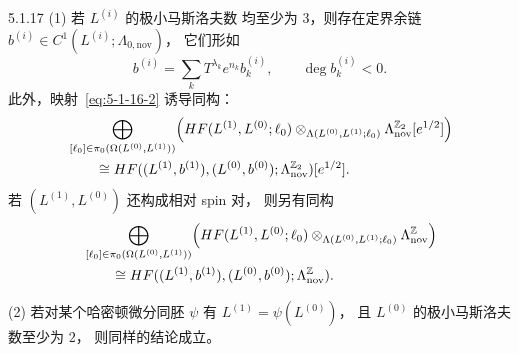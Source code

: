 \begin{proposition}{5.1.17}\label{prop:5-1-17}
\textup{(1)} 若 $L^{(i)}$ 的极小马斯洛夫数
均至少为 $3$，则存在定界余链
$b^{(i)}\in C^1(L^{(i)};\Lambda_{0,\mathrm{nov}})$，
它们形如
\[
b^{(i)}=\sum_k T^{\lambda_k}e^{n_k}b_k^{(i)},
\qquad \deg b_k^{(i)}<0.
\]
此外，映射~\eqref{eq:5-1-16-2}
诱导同构：
\[
\begin{aligned}
&\bigoplus_{[\ell_0]\in
 \pi_0(\Omega(L^{(0)},L^{(1)}))}
\Bigl(
HF(L^{(1)},L^{(0)};\ell_0)
\otimes_{\Lambda(L^{(0)},L^{(1)};\ell_0)}
\Lambda_{\mathrm{nov}}^{\mathbb Z_2}[e^{1/2}]
\Bigr)\\
&\hspace{2em}\cong
HF((L^{(1)},b^{(1)}),(L^{(0)},b^{(0)});
\Lambda_{\mathrm{nov}}^{\mathbb Z_2})[e^{1/2}].
\end{aligned}
\]
若 $(L^{(1)},L^{(0)})$ 还构成相对 spin 对，
则另有同构
\[
\begin{aligned}
&\bigoplus_{[\ell_0]\in
 \pi_0(\Omega(L^{(0)},L^{(1)}))}
\Bigl(
HF(L^{(1)},L^{(0)};\ell_0)
\otimes_{\Lambda(L^{(0)},L^{(1)};\ell_0)}
\Lambda_{\mathrm{nov}}^{\mathbb Z}
\Bigr)\\
&\hspace{2em}\cong
HF((L^{(1)},b^{(1)}),(L^{(0)},b^{(0)});
\Lambda_{\mathrm{nov}}^{\mathbb Z}).
\end{aligned}
\]

\textup{(2)} 若对某个哈密顿微分同胚
$\psi$ 有 $L^{(1)}=\psi(L^{(0)})$，
且 $L^{(0)}$ 的极小马斯洛夫数至少为 $2$，
则同样的结论成立。
\end{proposition}

